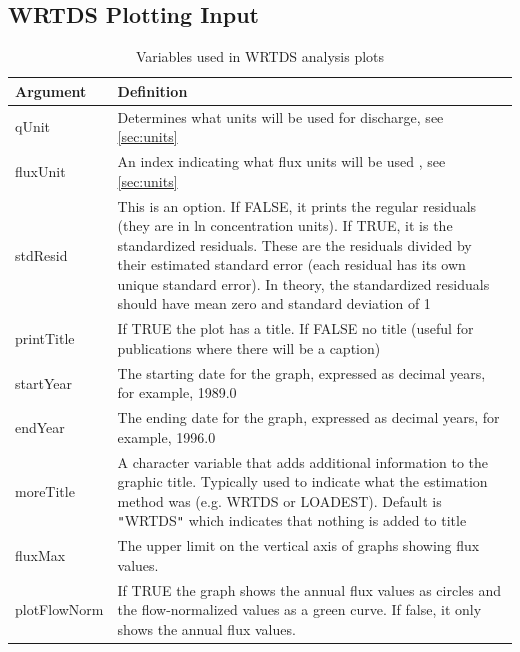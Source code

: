 \documentclass[a4paper,11pt]{article}\usepackage{graphicx, color}
\begin{document}
\FloatBarrier
\clearpage

\subsection{WRTDS Plotting Input}
\label{sec:wrtdsOutputVariables}

\begin{table}[ht]
\caption{Variables used in WRTDS analysis plots  \label{tab:wrtdsVariables}}
\begin{tabularx}{\textwidth}{lX}
\hline
  \textbf{Argument} & \textbf{Definition} \\
\hline
qUnit & Determines what units will be used for discharge, see \ref{sec:units}\\
fluxUnit & An index indicating what flux units will be used , see \ref{sec:units}\\
stdResid & This is an option.  If FALSE, it prints the regular residuals (they are in ln concentration units).  If TRUE, it is the standardized residuals.  These are the residuals divided by their estimated standard error (each residual has its own unique standard error).  In theory, the standardized residuals should have mean zero and standard deviation of 1 \\
printTitle & If TRUE the plot has a title.  If FALSE no title (useful for publications where there will be a caption) \\
startYear & The starting date for the graph, expressed as decimal years, for example, 1989.0 \\
endYear & The ending date for the graph, expressed as decimal years, for example, 1996.0 \\
moreTitle & A character variable that adds additional information to the graphic title.  Typically used to indicate what the estimation method was (e.g. WRTDS or LOADEST).  Default is \texttt{"}WRTDS\texttt{"} which indicates that nothing is added to title \\
fluxMax & The upper limit on the vertical axis of graphs showing flux values.  \\
plotFlowNorm & If TRUE the graph shows the annual flux values as circles and the flow-normalized values as a green curve.  If false, it only shows the annual flux values.\\
\hline
\end{tabularx}

\end{table}
\end{document}
